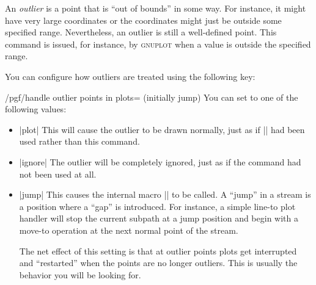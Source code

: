 \begin{command}{\pgfplotstreampointoutlier{}}
    An \emph{outlier} is a point that is ``out of bounds'' in some way. For
    instance, it might have very large coordinates or the coordinates might
    just be outside some specified range. Nevertheless, an outlier is still a
    well-defined point. This command is issued, for instance, by
    \textsc{gnuplot} when a value is outside the specified range.

    You can configure how outliers are treated using the following key:
    \begin{key}{/pgf/handle outlier points in plots= (initially jump)}
        You can set  to one of the following values:
        \begin{itemize}
            \item |plot| This will cause the outlier to be drawn normally, just
                as if |\pgfplotstreampoint| had been used rather than this
                command.
            \item |ignore| The outlier will be completely ignored, just as if
                the command had not been used at all.
            \item |jump| This causes the internal macro |\pgf@plotstreamjump|
                to be called. A ``jump'' in a stream is a position where a
                ``gap'' is introduced. For instance, a simple line-to plot
                handler will stop the current subpath at a jump position and
                begin with a move-to operation at the next normal point of the
                stream.

                The net effect of this setting is that at outlier points plots
                get interrupted and ``restarted'' when the points are no longer
                outliers. This is usually the behavior you will be looking for.
        \end{itemize}
    \end{key}
\end{command}

